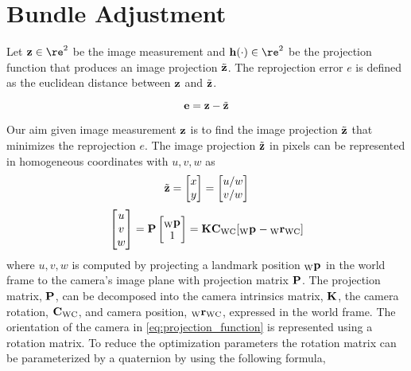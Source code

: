 \section{Bundle Adjustment}

Let $\measurement \in \re^{2}$ be the image measurement and $\projFunc(\cdot)
\in \re^{2}$ be the projection function that produces an image projection
${\tilde{{\mathbf{z}}}}$. The reprojection error $e$ is defined as the euclidean distance
between ${{\mathbf{z}}}$ and ${\tilde{{\mathbf{z}}}}$.

\begin{equation}
  {{\mathbf{e}}} = {{\mathbf{z}}} - {\tilde{{\mathbf{z}}}}
\end{equation}

Our aim given image measurement ${{\mathbf{z}}}$ is to find the image projection
${\tilde{{\mathbf{z}}}}$ that minimizes the reprojection $e$. The image projection
${\tilde{{\mathbf{z}}}}$ in pixels can be represented in homogeneous coordinates with
$u, v, w$ as
%
\begin{equation}
  {\tilde{{\mathbf{z}}}}
  = \begin{bmatrix} x \\ y \end{bmatrix}
  = \begin{bmatrix} u / w \\ v / w \end{bmatrix}
\end{equation}
%
\begin{align}
  \label{eq:projection_function}
  \begin{bmatrix} u \\ v \\ w \end{bmatrix}
    = {\mathbf{P}} \begin{bmatrix} {{{{}_{{\text{W}}}} {{\mathbf{p}}}_{}}} \\ 1 \end{bmatrix}
      = {\mathbf{K}} {{{{{{\mathbf{C}}}}_{{\text{W}}{\text{C}}}}}} [{{{{}_{{\text{W}}}} {{\mathbf{p}}}_{}}} - {{{{{}_{{\text{W}}}} {{{\mathbf{r}}}}_{{\text{W}}{\text{C}}}}}}]
\end{align}
%
where $u, v, w$ is computed by projecting a landmark position ${{{{}_{{\text{W}}}} {{\mathbf{p}}}_{}}}$ in
the world frame to the camera's image plane with projection matrix ${\mathbf{P}}$.
The projection matrix, ${\mathbf{P}}$, can be decomposed into the camera intrinsics
matrix, ${\mathbf{K}}$, the camera rotation, ${{{{{{\mathbf{C}}}}_{{\text{W}}{\text{C}}}}}}$, and camera position,
${{{{{}_{{\text{W}}}} {{{\mathbf{r}}}}_{{\text{W}}{\text{C}}}}}}$, expressed in the world frame.
%
The orientation of the camera in \eqref{eq:projection_function} is
represented using a rotation matrix. To reduce the optimization parameters
the rotation matrix can be parameterized by a quaternion by using the following
formula,
%
